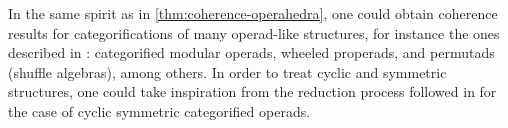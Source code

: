 In the same spirit as in \cref{thm:coherence-operahedra}, one could obtain coherence results for categorifications of many operad-like structures, for instance the ones described in \cite{BMO20}: categorified modular operads, wheeled properads, and permutads (shuffle algebras), among others.
In order to treat cyclic and symmetric structures, one could take inspiration from the reduction process followed in \cite{curienCategorifiedCyclicOperads2020} for the case of cyclic symmetric categorified operads.

